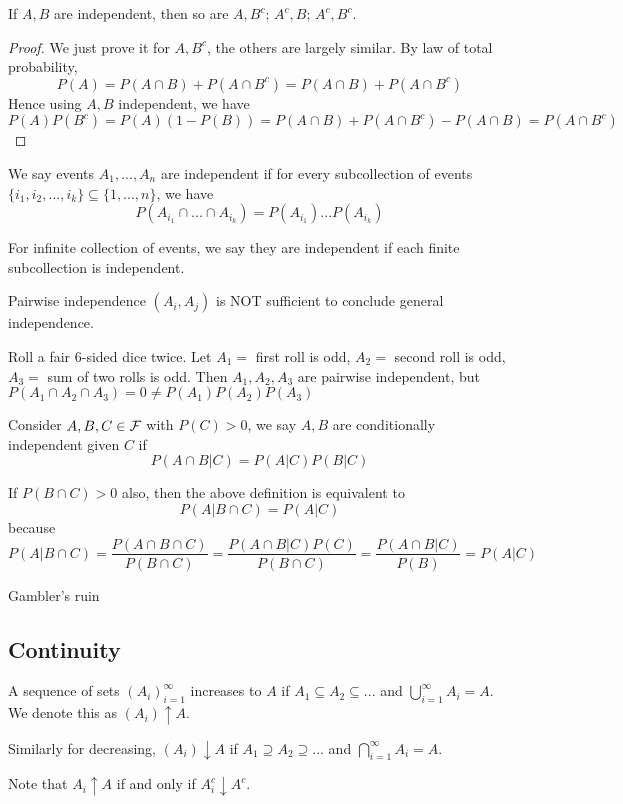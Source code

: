 \documentclass[11pt]{article}
\begin{document}
\begin{proposition}
  If \(A,B\) are independent, then so are \(A,B^c\); \(A^c,B\); \(A^c,B^c\).
\end{proposition}
\begin{proof}
  We just prove it for \(A,B^c\), the others are largely similar.
  By law of total probability,
  \[P(A)=P(A\cap B)+P(A\cap B^c)=P(A\cap B)+P(A\cap B^c)\]
  Hence using \(A,B\) independent, we have 
  \[P(A)P(B^c)=P(A)(1-P(B))=P(A\cap B)+P(A\cap B^c)-P(A\cap B)=P(A\cap B^c)\]
\end{proof}

\begin{definition}
  We say events \(A_1,...,A_n\) are independent if for every subcollection of events \(\{i_1,i_2,...,i_k\}\subseteq\{1,...,n\}\), we have 
  \[P(A_{i_1}\cap...\cap A_{i_k})=P(A_{i_1})...P(A_{i_k})\]

  For infinite collection of events, we say they are independent if each finite subcollection is independent.
\end{definition}

Pairwise independence \((A_i,A_j)\) is NOT sufficient to conclude general independence.
\begin{example}
  Roll a fair 6-sided dice twice. Let \(A_1=\) first roll is odd, \(A_2=\) second roll is odd, \(A_3=\) sum of two rolls is odd. Then \(A_1,A_2,A_3\) are pairwise independent, but \(P(A_1\cap A_2\cap A_3)=0\neq P(A_1)P(A_2)P(A_3)\) 
\end{example}

\begin{definition}
  Consider \(A,B,C\in\cal{F}\) with \(P(C)>0\), we say \(A,B\) are conditionally independent given \(C\) if
  \[P(A\cap B|C)=P(A|C)P(B|C)\]
\end{definition}
\begin{remark}
  If \(P(B\cap C)>0\) also, then the above definition is equivalent to
  \[P(A|B\cap C)=P(A|C)\]
  because 
  \[P(A|B\cap C)=\frac{P(A\cap B\cap C)}{P(B\cap C)}=\frac{P(A\cap B|C)P(C)}{P(B\cap C)}=\frac{P(A\cap B|C)}{P(B)}=P(A|C)\]
\end{remark}

\begin{extension}{Gambler's ruin}
\end{extension}

\subsection{Continuity}
\begin{definition}
  A sequence of sets \((A_i)_{i=1}^\infty\) increases to \(A\) if \(A_1\subseteq A_2\subseteq...\) and \(\bigcup_{i=1}^\infty A_i=A\). We denote this as \((A_i)\uparrow A\). 
  
  Similarly for decreasing, \((A_i)\downarrow A\) if \(A_1\supseteq A_2\supseteq...\) and \(\bigcap_{i=1}^\infty A_i=A\).
\end{definition}
Note that \(A_i \uparrow A\) if and only if \(A_i^c\downarrow A^c\).
\end{document}
